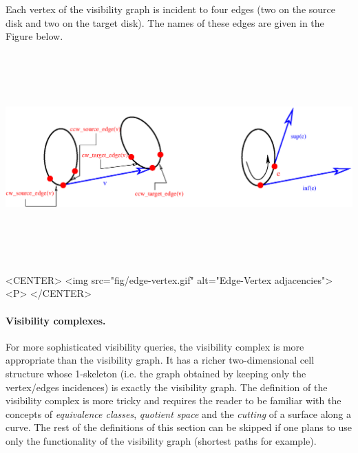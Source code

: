 Each vertex of the visibility graph is incident to four edges (two on the source
disk and two on the target disk). The names of these edges are given in the
Figure below.
\begin{ccTexOnly}
    \begin{center}
        \includegraphics[height=8cm,width=\linewidth]{fig/edge-vertex.eps}%
    \end{center}
\end{ccTexOnly}

\begin{ccHtmlOnly}
    <CENTER>
        <img src="fig/edge-vertex.gif" alt="Edge-Vertex adjacencies"><P>
    </CENTER>
\end{ccHtmlOnly}

\paragraph{Visibility complexes. }
For more sophisticated visibility queries, the visibility complex is more
appropriate than the visibility graph. It has a richer two-dimensional cell
structure whose 1-skeleton (i.e. the graph obtained by keeping only the
vertex/edges incidences) is exactly the visibility graph. The definition of the
visibility complex is more tricky and requires the reader to be familiar with
the concepts of \emph{equivalence classes}, \emph{quotient space} and the
\emph{cutting} of a surface along a curve. The rest of the definitions of this
section can be skipped if one plans to use only the functionality of the
visibility graph (shortest paths for example).

